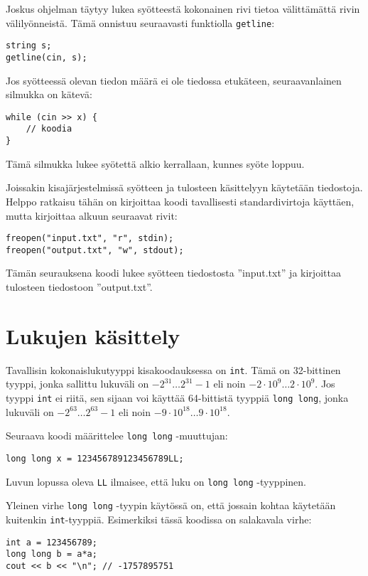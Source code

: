 Joskus ohjelman täytyy lukea syötteestä
kokonainen rivi tietoa
välittämättä rivin välilyönneistä.
Tämä onnistuu seuraavasti funktiolla
\texttt{getline}:

\begin{lstlisting}
string s;
getline(cin, s);
\end{lstlisting}

Jos syötteessä olevan tiedon määrä ei ole tiedossa
etukäteen, seuraavanlainen silmukka on kätevä:
\begin{lstlisting}
while (cin >> x) {
    // koodia
}
\end{lstlisting}
Tämä silmukka lukee syötettä alkio
kerrallaan, kunnes syöte loppuu.

Joissakin kisajärjestelmissä syötteen ja tulosteen
käsittelyyn käytetään tiedostoja. Helppo ratkaisu tähän
on kirjoittaa koodi tavallisesti
standardivirtoja käyttäen,
mutta kirjoittaa alkuun seuraavat rivit:
\begin{lstlisting}
freopen("input.txt", "r", stdin);
freopen("output.txt", "w", stdout);
\end{lstlisting}
Tämän seurauksena koodi lukee syötteen tiedostosta
''input.txt'' ja kirjoittaa tulosteen
tiedostoon ''output.txt''.

\section{Lukujen käsittely}


Tavallisin kokonaislukutyyppi kisakoodauksessa on \texttt{int}.
Tämä on 32-bittinen tyyppi,
jonka sallittu lukuväli on $-2^{31} \ldots 2^{31}-1$
eli noin $-2 \cdot 10^9 \ldots 2 \cdot 10^9$.
Jos tyyppi \texttt{int} ei riitä, sen sijaan voi käyttää
64-bittistä tyyppiä
\texttt{long long}, jonka lukuväli on $-2^{63} \ldots 2^{63}-1$
eli noin $-9 \cdot 10^{18} \ldots 9 \cdot 10^{18}$.

Seuraava koodi määrittelee
\texttt{long long} -muuttujan:
\begin{lstlisting}
long long x = 123456789123456789LL;
\end{lstlisting}
Luvun lopussa oleva \texttt{LL}
ilmaisee, että luku on \texttt{long long} -tyyppinen.

Yleinen virhe \texttt{long long} -tyypin käytössä on,
että jossain kohtaa käytetään kuitenkin \texttt{int}-tyyppiä.
Esimerkiksi tässä koodissa on salakavala virhe:

\begin{lstlisting}
int a = 123456789;
long long b = a*a;
cout << b << "\n"; // -1757895751
\end{lstlisting}

